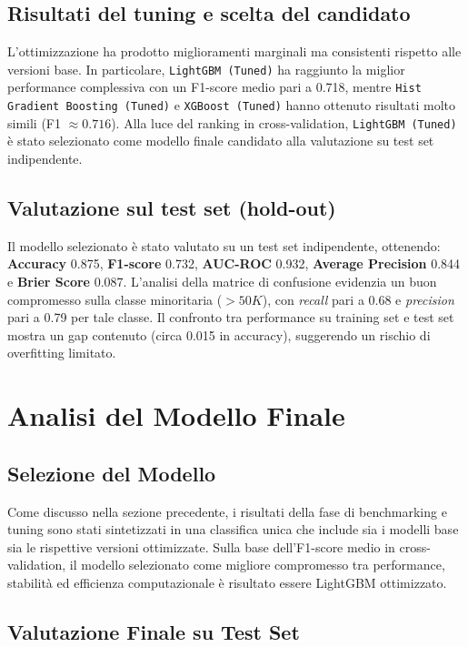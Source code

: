 \documentclass[a4paper,11pt]{article}
\begin{document}
\subsection{Risultati del tuning e scelta del candidato}
L’ottimizzazione ha prodotto miglioramenti marginali ma consistenti rispetto alle versioni base. 
In particolare, \texttt{LightGBM (Tuned)} ha raggiunto la miglior performance complessiva con un F1-score medio pari a 0.718, mentre \texttt{Hist Gradient Boosting (Tuned)} e \texttt{XGBoost (Tuned)} hanno ottenuto risultati molto simili (F1 $\approx 0.716$). 
Alla luce del ranking in cross-validation, \texttt{LightGBM (Tuned)} è stato selezionato come modello finale candidato alla valutazione su test set indipendente. 

\subsection{Valutazione sul test set (hold-out)}
Il modello selezionato è stato valutato su un test set indipendente, ottenendo: \textbf{Accuracy} 0.875, \textbf{F1-score} 0.732, \textbf{AUC-ROC} 0.932, \textbf{Average Precision} 0.844 e \textbf{Brier Score} 0.087. 
L’analisi della matrice di confusione evidenzia un buon compromesso sulla classe minoritaria (\(>50K\)), con \textit{recall} pari a 0.68 e \textit{precision} pari a 0.79 per tale classe. 
Il confronto tra performance su training set e test set mostra un gap contenuto (circa 0.015 in accuracy), suggerendo un rischio di overfitting limitato. 

\newpage
\section{Analisi del Modello Finale}

\subsection{Selezione del Modello}

Come discusso nella sezione precedente, i risultati della fase di benchmarking e tuning sono stati sintetizzati in una classifica unica che include sia i modelli base sia le rispettive versioni ottimizzate.  
Sulla base dell’F1-score medio in cross-validation, il modello selezionato come migliore compromesso tra performance, stabilità ed efficienza computazionale è risultato essere {LightGBM ottimizzato}.

\subsection{Valutazione Finale su Test Set}
\end{document}
